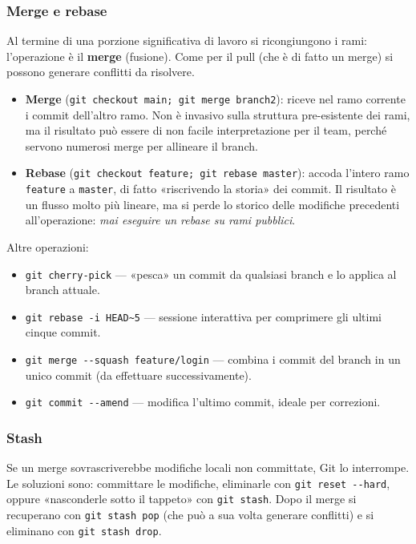 \documentclass[a4paper,12pt]{article}
\begin{document}
\subsubsection{Merge e rebase}

Al termine di una porzione significativa di lavoro si ricongiungono i rami: l'operazione
è il \textbf{merge} (fusione). Come per il pull (che è di fatto un merge) si possono
generare conflitti da risolvere.

\begin{itemize}
  \item \textbf{Merge} (\verb|git checkout main; git merge branch2|): riceve nel ramo
        corrente i commit dell'altro ramo. Non è invasivo sulla struttura pre-esistente
        dei rami, ma il risultato può essere di non facile interpretazione per il team,
        perché servono numerosi merge per allineare il branch.
  \item \textbf{Rebase} (\verb|git checkout feature; git rebase master|): accoda l'intero
        ramo \texttt{feature} a \texttt{master}, di fatto «riscrivendo la storia» dei
        commit. Il risultato è un flusso molto più lineare, ma si perde lo storico delle
        modifiche precedenti all'operazione: \emph{mai eseguire un rebase su rami
        pubblici}.
\end{itemize}

Altre operazioni:
\begin{itemize}
  \item \verb|git cherry-pick| --- «pesca» un commit da qualsiasi branch e lo applica al
        branch attuale.
  \item \verb|git rebase -i HEAD~5| --- sessione interattiva per comprimere gli ultimi
        cinque commit.
  \item \verb|git merge --squash feature/login| --- combina i commit del branch in un
        unico commit (da effettuare successivamente).
  \item \verb|git commit --amend| --- modifica l'ultimo commit, ideale per correzioni.
\end{itemize}

\subsubsection{Stash}

Se un merge sovrascriverebbe modifiche locali non committate, Git lo interrompe. Le
soluzioni sono: committare le modifiche, eliminarle con \verb|git reset --hard|, oppure
«nasconderle sotto il tappeto» con \verb|git stash|. Dopo il merge si recuperano con
\verb|git stash pop| (che può a sua volta generare conflitti) e si eliminano con
\verb|git stash drop|.
\end{document}
